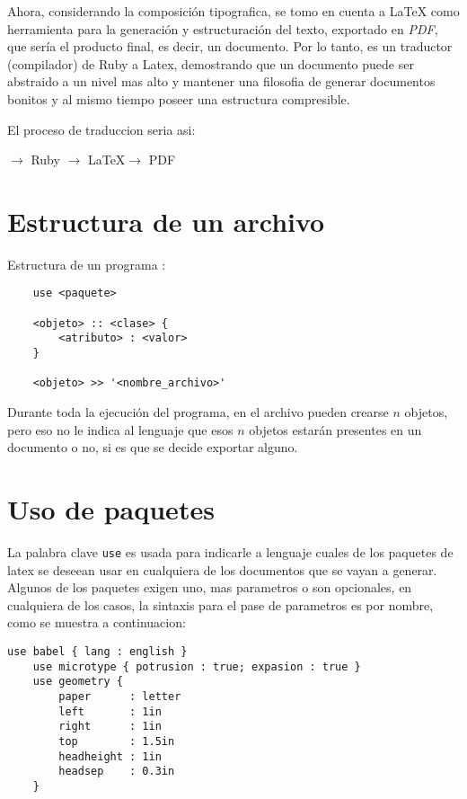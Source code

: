 \documentclass[12pt,letterpaper,titlepage,oneside,openright]{book}
\newcommand{\OhTeX}{%
    \makebox[0.76em][c]{O}%
    \makebox[0.25em][c]{%
        \raisebox{0.14em}[0em][0em]{%
            \fontsize{0.5em}{0cm}%
                \selectfont H%
        }%
    }%
    \makebox[1.35em][c]{\TeX}%
}
\newcommand{\latex}{\LaTeX\xspace}
\newcommand{\ohtex}{\OhTeX\xspace}
\begin{document}
Ahora, considerando la composición tipografica, se tomo en cuenta a \latex como
herramienta para la generación y estructuración del texto, exportado en
\textit{PDF}, que sería el producto final, es decir, un documento. Por lo tanto,
\ohtex es un traductor (compilador) de Ruby a Latex, demostrando que un
documento puede ser abstraido a un nivel mas alto y mantener una filosofia de
generar documentos bonitos y al mismo tiempo poseer una estructura compresible.

El proceso de traduccion seria asi:

\begin{center}
    \ohtex $\longrightarrow$ Ruby $\longrightarrow$ \latex $\longrightarrow$ PDF
\end{center}

\section[Estructura de un archivo OhTeX]{Estructura de un archivo \ohtex}

Estructura de un programa \ohtex:

\begin{center}
\begin{lstlisting}
    use <paquete>

    <objeto> :: <clase> {
        <atributo> : <valor> 
    }

    <objeto> >> '<nombre_archivo>'
\end{lstlisting}
\end{center}


Durante toda la ejecución del programa, en el archivo pueden crearse $n$
objetos, pero eso no le indica al lenguaje que esos $n$ objetos estarán
presentes en un documento o no, si es que se decide exportar alguno.

\section{Uso de paquetes}

La palabra clave \texttt{use} es usada para indicarle a lenguaje cuales de los
paquetes de latex se deseean usar en cualquiera de los documentos que se vayan a
generar. Algunos de los paquetes exigen uno, mas parametros o son opcionales, en
cualquiera de los casos, la sintaxis para el pase de parametros es por nombre,
como se muestra a continuacion:

\begin{center}
\begin{lstlisting}[caption={Paquetes},label=pkgs]
    use babel { lang : english }
    use microtype { potrusion : true; expasion : true }
    use geometry {
        paper      : letter
        left       : 1in
        right      : 1in
        top        : 1.5in
        headheight : 1in
        headsep    : 0.3in
    }
\end{lstlisting}
\end{center}
\end{document}
